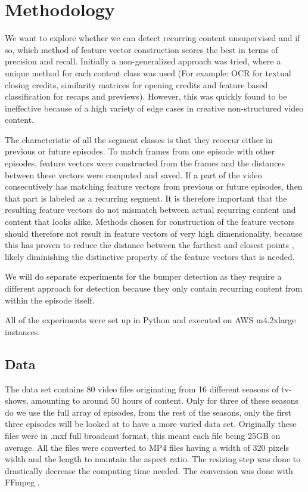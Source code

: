 \documentclass{article}
\begin{document}
\section{Methodology} \label{methodology}
We want to explore whether we can detect recurring content unsupervised and if so, which method of feature vector construction scores the best in terms of precision and recall. Initially a non-generalized approach was tried, where a unique method for each content class was used (For example: OCR for textual closing credits, similarity matrices for opening credits and feature based classification for recaps and previews). However, this was quickly found to be ineffective because of a high variety of edge cases in creative non-structured video content. 

The characteristic of all the segment classes is that they reoccur either in previous or future episodes. To match frames from one episode with other episodes, feature vectors were constructed from the frames and the distances between these vectors were computed and saved. If a part of the video consecutively has matching feature vectors from previous or future episodes, then that part is labeled as a recurring segment. It is therefore important that the resulting feature vectors do not mismatch between actual recurring content and content that looks alike. Methods chosen for construction of the feature vectors should therefore not result in feature vectors of very high dimensionality, because this has proven to reduce the distance between the farthest and closest points \cite{beyer1999nearest}, likely diminishing the distinctive property of the feature vectors that is needed.

We will do separate experiments for the bumper detection as they require a different approach for detection because they only contain recurring content from within the episode itself.

All of the experiments were set up in Python and executed on AWS m4.2xlarge instances.

\subsection{Data}
The data set contains 80 video files originating from 16 different seasons of tv-shows, amounting to around 50 hours of content. Only for three of these seasons do we use the full array of episodes, from the rest of the seasons, only the first three episodes will be looked at to have a more varied data set. Originally these files were in .mxf full broadcast format, this meant each file being 25GB on average. All the files were converted to MP4 files having a width of 320 pixels width and the length to maintain the aspect ratio. The resizing step was done to drastically decrease the computing time needed. The conversion was done with FFmpeg \cite{ffmpeg}.
\end{document}
